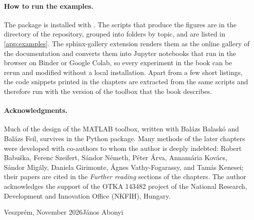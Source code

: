 \paragraph{How to run the examples.} The package is installed with . The scripts that produce the figures are in the  directory of the repository, grouped into folders by topic, and are listed in \cref{app:examples}. The sphinx-gallery extension renders them as the online gallery of the documentation and converts them into Jupyter notebooks that run in the browser on Binder or Google Colab, so every experiment in the book can be rerun and modified without a local installation. Apart from a few short listings, the code snippets printed in the chapters are extracted from the same scripts and therefore run with the version of the toolbox that the book describes.

\paragraph{Acknowledgments.} Much of the design of the MATLAB toolbox, written with Balázs Balaskó and Balázs Feil, survives in the Python package. Many methods of the later chapters were developed with co-authors to whom the author is deeply indebted: Robert Babuška, Ferenc Szeifert, Sándor Németh, Péter Árva, Annamária Kovács, Sándor Migály, Daniela Girimonte, Ágnes Vathy-Fogarassy, and Tamás Kenesei; their papers are cited in the \emph{Further reading} sections of the chapters. The author acknowledges the support of the OTKA 143482 project of the National Research, Development and Innovation Office (NKFIH), Hungary.

\bigskip
\noindent Veszprém, November 2026\hfill János Abonyi
